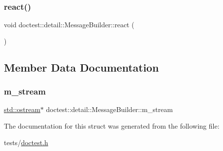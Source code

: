 \mbox{\label{structdoctest_1_1detail_1_1MessageBuilder_a3a65c5e39a0c04ae8e2a7c34997a2e4d}} 
\subsubsection{\texorpdfstring{react()}{react()}}
{\footnotesize\ttfamily void doctest\+::detail\+::\+Message\+Builder\+::react (\begin{DoxyParamCaption}{ }\end{DoxyParamCaption})}



\subsection{Member Data Documentation}
\mbox{\label{structdoctest_1_1detail_1_1MessageBuilder_a5319d522ba62c91e59ffa7f6982756e5}} 
\subsubsection{\texorpdfstring{m\+\_\+stream}{m\_stream}}
{\footnotesize\ttfamily \hyperlink{doctest_8h_a116af65cb5e924b33ad9d9ecd7a783f3}{std\+::ostream}$\ast$ doctest\+::detail\+::\+Message\+Builder\+::m\+\_\+stream}



The documentation for this struct was generated from the following file\+:\begin{DoxyCompactItemize}
\item 
tests/\hyperlink{doctest_8h}{doctest.\+h}\end{DoxyCompactItemize}
